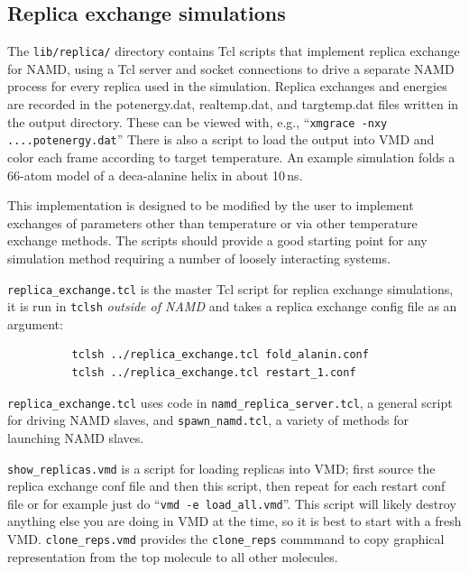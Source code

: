 \subsection{Replica exchange simulations}

The {\tt lib/replica/}
directory contains Tcl scripts that implement replica exchange
for NAMD, using a Tcl server and socket connections to drive a
separate NAMD process for every replica used in the simulation.
Replica exchanges and energies are recorded in the potenergy.dat,
realtemp.dat, and targtemp.dat files written in the output directory.
These can be viewed with, e.g., ``{\tt xmgrace -nxy ....potenergy.dat}''
There is also a script to load the output into VMD and color each
frame according to target temperature.  An example simulation folds
a 66-atom model of a deca-alanine helix in about 10\,ns.

This implementation is designed to be modified by the user to implement
exchanges of parameters other than temperature or via other temperature
exchange methods.  The scripts should provide a good starting point for
any simulation method requiring a number of loosely interacting systems.

{\tt replica\_exchange.tcl}
is the master Tcl script for replica exchange simulations, it is run in
{\tt tclsh} {\em outside of NAMD} and takes a replica exchange config
file as an argument:
\begin{verbatim}
          tclsh ../replica_exchange.tcl fold_alanin.conf
          tclsh ../replica_exchange.tcl restart_1.conf
\end{verbatim}
{\tt replica\_exchange.tcl} uses code in
{\tt namd\_replica\_server.tcl}, a general script for driving NAMD slaves, and
{\tt spawn\_namd.tcl}, a variety of methods for launching NAMD slaves.

{\tt show\_replicas.vmd} is a script for loading replicas into VMD;
first source the replica exchange conf file and then this script, then
repeat for each restart conf file or for example just do
``{\tt vmd -e load\_all.vmd}''.
This script will likely destroy anything else you are doing in VMD at the
time, so it is best to start with a fresh VMD.
{\tt clone\_reps.vmd} provides the {\tt clone\_reps} commmand to copy graphical
representation from the top molecule to all other molecules.

